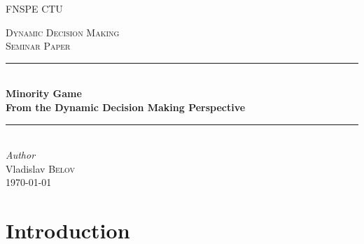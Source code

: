\documentclass[11pt,american,czech]{article}
\begin{document}
\def\documentdate{...}


\begin{titlepage} %
	\newcommand{\HRule}{\rule{\linewidth}{0.5mm}} %
	\center %
	
	\textsc{\LARGE FNSPE CTU}\\[1.5cm] %
	\vfill
	
	\textsc{\Large Dynamic Decision Making}\\[0.5cm] %
	\textsc{\large Seminar Paper}\\[0.5cm] %
	\HRule\\[0.4cm]
	{\huge\bfseries Minority Game}\\
	{\LARGE\bfseries From the Dynamic Decision Making Perspective}\\[0.4cm] %
	\HRule\\[1.5cm]
	{\large\textit{Author}}\\
	Vladislav \textsc{Belov}\\
	\vfill\vfill\vfill\vfill\vfill\vfill\vfill %
	{\large\today} %
	
	
%	
	
	\vfill %
	
\end{titlepage}


\section{Introduction}\label{sec:introduction}
\end{document}

